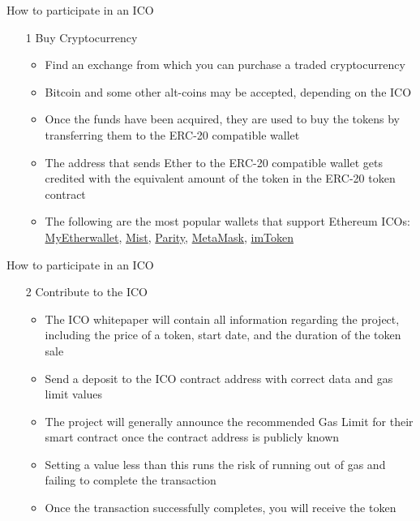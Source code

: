 \documentclass[10pt]{beamer}
\begin{document}


\begin{frame}{How to participate in an ICO}
	\begin{enumerate}
		\item[1] Buy Cryptocurrency
		\begin{itemize}
			\item Find an exchange from which you can purchase a traded cryptocurrency
			\item Bitcoin and some other alt-coins may be accepted, depending on the ICO
			\item Once the funds have been acquired, they are used to buy the tokens by transferring them to the ERC-20 compatible wallet
			\item The address that sends Ether to the ERC-20 compatible wallet gets credited with the equivalent amount of the token in the ERC-20 token contract
			\item The following are the most popular wallets that support Ethereum ICOs: \href{https://www.myetherwallet.com/}{MyEtherwallet}, \href{https://github.com/ethereum/mist/releases}{Mist}, \href{https://ethcore.io/parity.html}{Parity}, \href{https://metamask.io/}{MetaMask}, \href{https://itunes.apple.com/us/app/imtoken/id1153230571?ls=1&mt=8}{imToken}
		\end{itemize}
	\end{enumerate}
\end{frame}


\begin{frame}{How to participate in an ICO}
	\begin{enumerate}
		\item[2] Contribute to the ICO
		\begin{itemize}
			\item The ICO whitepaper will contain all information regarding the project, including the price of a token, start date, and the duration of the token sale
			\item Send a deposit to the ICO contract address with correct data and gas limit values
			\item The project will generally announce the recommended Gas Limit for their smart contract once the contract address is publicly known
			\item Setting a value less than this runs the risk of running out of gas and failing to complete the transaction
			\item Once the transaction successfully completes, you will receive the token
		\end{itemize}
	\end{enumerate}
\end{frame}
\end{document}
